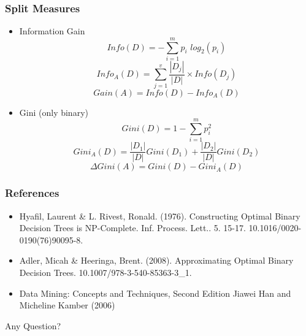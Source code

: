 \documentclass{beamer}
\begin{document}
\begin{frame}
	\frametitle{Split Measures}
	\begin{itemize}
		\item Information Gain
		\[Info(D)=-\sum_{i=1}^{m} p_i\hspace{4pt} log_2 (p_i)\]
		\[Info_A(D)= \sum_{j=1}^{v} \frac{|D_j|}{|D|}\times Info(D_j)\]
		\[Gain(A) = Info(D) - Info_A(D) \]
		
		\item Gini (only binary)
		\[Gini(D) = 1- \sum_{i=1}^{m} p_i^2\]
		\[Gini_A(D) = \frac{|D_1|}{|D|}Gini(D_1) + \frac{|D_2|}{|D|}Gini(D_2)\]
		\[\Delta Gini(A) = Gini(D) - Gini_A(D)\]
	\end{itemize}
\end{frame}

\begin{frame}
	\frametitle{References}
	\begin{itemize}
		\item
		Hyafil, Laurent \& L. Rivest, Ronald. (1976). Constructing Optimal Binary Decision Trees is NP-Complete. Inf. Process. Lett.. 5. 15-17. 10.1016/0020-0190(76)90095-8. 
		\item
		Adler, Micah \& Heeringa, Brent. (2008). Approximating Optimal Binary Decision Trees. 10.1007/978-3-540-85363-3\_1. 
		\item
		Data Mining: Concepts and Techniques, Second Edition
		Jiawei Han and Micheline Kamber (2006)
	\end{itemize}
\end{frame}

\begin{frame}
	\Huge
	\centering
	Any Question?
\end{frame}
\end{document}
